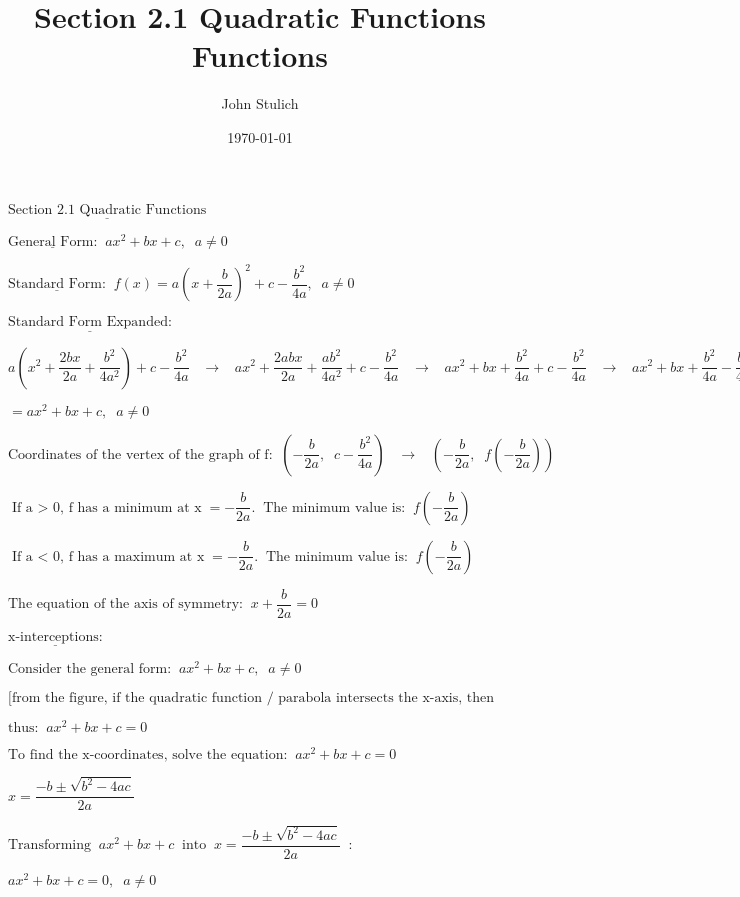 \documentclass[12pt]{article}
\title{\textbf{Section 2.1 Quadratic Functions} \\
\Quadratic Functions}
\author{
	John Stulich
}
\date{\today}
\begin{document}
\maketitle

$\underline{\text{Section 2.1 Quadratic Functions}}$

$\underline{\text{General Form:}} \;\; ax^2 + bx + c, \;\; a \neq 0 $

$\underline{\text{Standard Form:}} \;\; f(x) = a\left(x + \dfrac{b}{2a}\right)^2 + c - \dfrac{b^2}{4a}, \;\; a \neq 0 $

$\underline{\text{Standard Form Expanded:}}$

$a\left(x^2 + \dfrac{2bx}{2a} + \dfrac{b^2}{4a^2}\right) + c - \dfrac{b^2}{4a} \;\;\; \rightarrow \;\;\; ax^2 + \dfrac{2abx}{2a} + \dfrac{ab^2}{4a^2} + c - \dfrac{b^2}{4a} \;\;\; \rightarrow \;\;\; ax^2 + bx + \dfrac{b^2}{4a} + c - \dfrac{b^2}{4a} \;\;\; \rightarrow \;\;\; ax^2 + bx + \dfrac{b^2}{4a} - \dfrac{b^2}{4a} + c$

$= ax^2 + bx + c, \;\; a \neq 0$

$\text{Coordinates of the vertex of the graph of f:} \;\; \left(-\dfrac{b}{2a}, \;\; c - \dfrac{b^2}{4a} \right) \;\;\; \rightarrow \;\;\; \left(-\dfrac{b}{2a}, \;\; f\left(-\dfrac{b}{2a}\right) \right)$

$\text{If a $>$ 0, f has a minimum at x} = -\dfrac{b}{2a}. \;\; \text{The minimum value is:} \;\; f\left(-\dfrac{b}{2a}\right)$

$\text{If a $<$ 0, f has a maximum at x} = -\dfrac{b}{2a}. \;\; \text{The minimum value is:} \;\; f\left(-\dfrac{b}{2a}\right)$

$\text{The equation of the axis of symmetry:} \;\; x + \dfrac{b}{2a} = 0$

$\underline{\text{x-interceptions:}}$

$\text{Consider the general form:} \;\; ax^2 + bx + c, \;\; a \neq 0 $

$\text{[from the figure, if the quadratic function / parabola intersects the x-axis, then the y-coordinate is always zero]}$

$\text{thus:} \;\; ax^2 + bx + c = 0$

$\text{To find the x-coordinates, solve the equation:} \;\; ax^2 + bx + c = 0$

$x = \dfrac{-b \pm \sqrt{b^2 - 4ac}}{2a}$

$\text{Transforming} \;\; ax^2 + bx + c \;\; \text{into} \;\; x = \dfrac{-b \pm \sqrt{b^2 - 4ac}}{2a} \;\; :$

$ax^2 + bx + c = 0, \;\; a \neq 0 $
\end{document}
